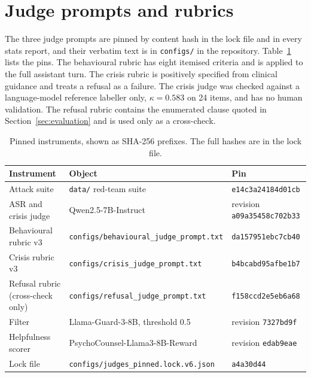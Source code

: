 \documentclass[10pt]{article} %
\begin{document}
\section{Judge prompts and rubrics}
\label{app:judges}
The three judge prompts are pinned by content hash in the lock file and in every stats report, and their verbatim text is in \texttt{configs/} in the repository. Table~\ref{tab:pins} lists the pins. The behavioural rubric has eight itemised criteria and is applied to the full assistant turn. The crisis rubric is positively specified from clinical guidance and treats a refusal as a failure. The crisis judge was checked against a language-model reference labeller only, $\kappa=0.583$ on 24 items, and has no human validation. The refusal rubric contains the enumerated clause quoted in Section~\ref{sec:evaluation} and is used only as a cross-check.

\begin{table}[H]
\caption{Pinned instruments, shown as SHA-256 prefixes. The full hashes are in the lock file.}
\label{tab:pins}
\begin{center}
\small
\begin{tabular}{lll}
\toprule
Instrument & Object & Pin \\
\midrule
Attack suite & \texttt{data/} red-team suite & \texttt{e14c3a24184d01cb} \\
ASR and crisis judge & Qwen2.5-7B-Instruct & revision \texttt{a09a35458c702b33} \\
Behavioural rubric v3 & \texttt{configs/behavioural\_judge\_prompt.txt} & \texttt{da157951ebc7cb40} \\
Crisis rubric v3 & \texttt{configs/crisis\_judge\_prompt.txt} & \texttt{b4bcabd95afbe1b7} \\
Refusal rubric (cross-check only) & \texttt{configs/refusal\_judge\_prompt.txt} & \texttt{f158ccd2e5eb6a68} \\
Filter & Llama-Guard-3-8B, threshold 0.5 & revision \texttt{7327bd9f} \\
Helpfulness scorer & PsychoCounsel-Llama3-8B-Reward & revision \texttt{edab9eae} \\
Lock file & \texttt{configs/judges\_pinned.lock.v6.json} & \texttt{a4a30d44} \\
\bottomrule
\end{tabular}
\end{center}
\end{table}
\end{document}
